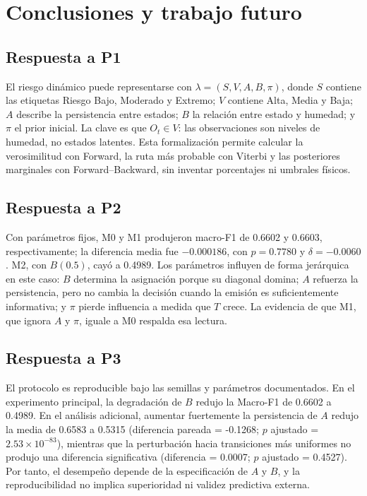 \documentclass[11pt,letterpaper]{article}
\begin{document}
\section{Conclusiones y trabajo futuro}

\subsection{Respuesta a P1}

El riesgo dinámico puede representarse con \(\lambda=(S,V,A,B,\pi)\), donde \(S\) contiene las etiquetas Riesgo Bajo, Moderado y Extremo; \(V\) contiene Alta, Media y Baja; \(A\) describe la persistencia entre estados; \(B\) la relación entre estado y humedad; y \(\pi\) el prior inicial. La clave es que \(O_t\in V\): las observaciones son niveles de humedad, no estados latentes. Esta formalización permite calcular la verosimilitud con Forward, la ruta más probable con Viterbi y las posteriores marginales con Forward--Backward, sin inventar porcentajes ni umbrales físicos.

\subsection{Respuesta a P2}

Con parámetros fijos, M0 y M1 produjeron macro-F1 de 0.6602 y 0.6603, respectivamente; la diferencia media fue \(-0.000186\), con \(p=0.7780\) y \(\delta=-0.0060\). M2, con \(B(0.5)\), cayó a 0.4989. Los parámetros influyen de forma jerárquica en este caso: \(B\) determina la asignación porque su diagonal domina; \(A\) refuerza la persistencia, pero no cambia la decisión cuando la emisión es suficientemente informativa; y \(\pi\) pierde influencia a medida que \(T\) crece. La evidencia de que M1, que ignora \(A\) y \(\pi\), iguale a M0 respalda esa lectura.

\subsection{Respuesta a P3}

El protocolo es reproducible bajo las semillas y parámetros documentados. En el experimento principal, la degradación de \(B\) redujo la Macro-F1 de 0.6602 a 0.4989. En el análisis adicional, aumentar fuertemente la persistencia de \(A\) redujo la media de 0.6583 a 0.5315 (diferencia pareada = -0.1268; \(p\) ajustado = \(2.53\times10^{-83}\)), mientras que la perturbación hacia transiciones más uniformes no produjo una diferencia significativa (diferencia = 0.0007; \(p\) ajustado = 0.4527). Por tanto, el desempeño depende de la especificación de \(A\) y \(B\), y la reproducibilidad no implica superioridad ni validez predictiva externa.
\end{document}
